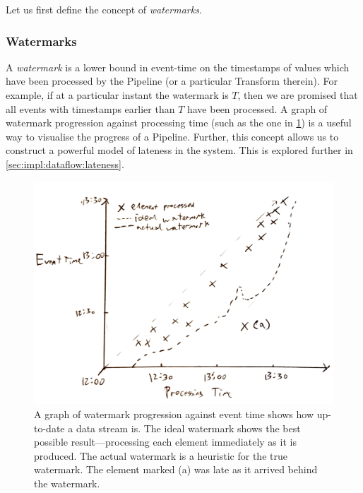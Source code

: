 Let us first define the concept of \emph{watermarks}.

\subsubsection{Watermarks}


A \emph{watermark} is a lower bound in event-time on the timestamps of values which have been processed by the Pipeline (or a particular Transform therein).
For example, if at a particular instant the watermark is $T$, then we are promised that all events with timestamps earlier than $T$ have been processed.
A graph of watermark progression against processing time (such as the one in \cref{fig:prep:watermark-progression}) is a useful way to visualise the progress of a Pipeline.
Further, this concept allows us to construct a powerful model of lateness in the system.
This is explored further in \cref{sec:impl:dataflow:lateness}.

\begin{figure}[h]
	\includegraphics[width=\textwidth]{images/temp/watermark-progression-example}
	\caption[An example of a watermark progression plotted against event time, showing late data as falling behind the watermark.]{A graph of watermark progression against event time shows how up-to-date a data stream is. The ideal watermark shows the best possible result---processing each element immediately as it is produced. The actual watermark is a heuristic for the true watermark. The element marked (a) was late as it arrived behind the watermark.}
	\label{fig:prep:watermark-progression}
\end{figure}

